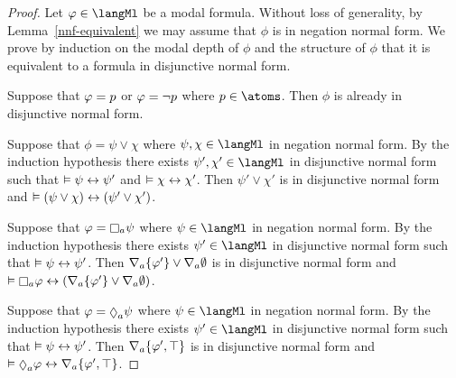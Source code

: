 \begin{proof}
Let $\phi \in \langMl$ be a modal formula.
Without loss of generality, by Lemma~\ref{nnf-equivalent} we may assume that $\phi$ is in negation normal form.
We prove by induction on the modal depth of $\phi$ and the structure of $\phi$ that it is equivalent to a formula in disjunctive normal form.

Suppose that $\varphi = p$ or $\varphi = \lnot p$ where $\atomP \in \atoms$.
Then $\phi$ is already in disjunctive normal form.

Suppose that $\phi = \psi \lor \chi$ where $\psi, \chi \in \langMl$ in negation normal form.
By the induction hypothesis there exists $\psi', \chi' \in \langMl$ in disjunctive normal form such that $\vDash \psi \leftrightarrow \psi'$ and $\vDash \chi \leftrightarrow \chi'$.
Then $\psi' \lor \chi'$ is in disjunctive normal form and $\vDash (\psi \lor \chi) \leftrightarrow (\psi' \lor \chi')$.

Suppose that $\phi = \necessaryA \psi$ where $\psi \in \langMl$ in negation normal form.
By the induction hypothesis there exists $\psi' \in \langMl$ in disjunctive normal form such that $\vDash \psi \leftrightarrow \psi'$.
Then $\nabla_{a} \{\varphi'\} \lor \nabla_{a} \emptyset$ is in disjunctive normal form and $\entails \necessaryA \phi \iff (\coversA \{\phi'\} \lor \coversA \emptyset)$.

Suppose that $\phi = \possibleA \psi$ where $\psi \in \langMl$ in negation normal form.
By the induction hypothesis there exists $\psi' \in \langMl$ in disjunctive normal form such that $\vDash \psi \leftrightarrow \psi'$.
Then $\nabla_{a} \{\varphi', \top\}$ is in disjunctive normal form and $\entails \possibleA \phi \iff \coversA \{\phi', \top\}$.


\end{proof}
